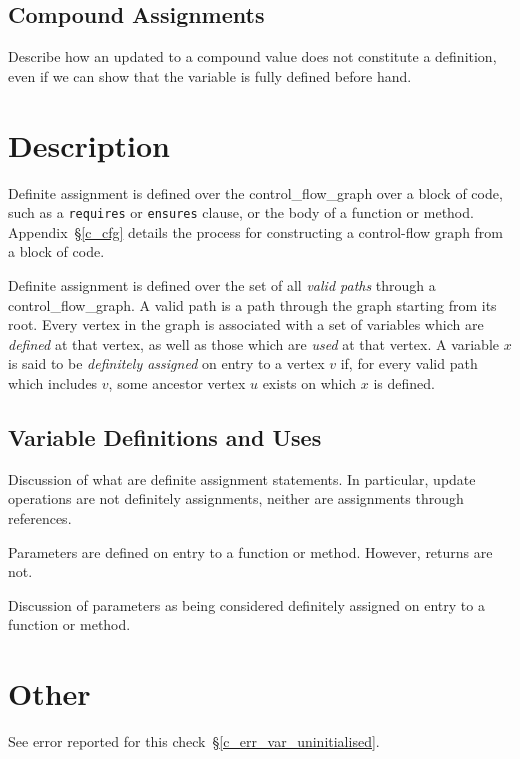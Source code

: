 \subsection{Compound Assignments}

Describe how an updated to a compound value does not constitute a definition, even if we can show that the variable is fully defined before hand.

\section{Description}

Definite assignment is defined over the \gls{control_flow_graph} over a block of code, such as a \lstinline{requires} or \lstinline{ensures} clause, or the body of a function or method.  Appendix~\S\ref{c_cfg} details the process for constructing a control-flow graph from a block of code.

Definite assignment is defined over the set of all {\em valid paths} through a \gls{control_flow_graph}.  A valid path is a path through the graph starting from its root.  Every vertex in the graph is associated with a set of variables which are {\em defined} at that vertex, as well as those which are {\em used} at that vertex.  A variable $x$ is said to be {\em definitely assigned} on entry to a vertex $v$ if, for every valid path which includes $v$, some ancestor vertex $u$ exists on which $x$ is defined.

\subsection{Variable Definitions and Uses}

Discussion of what are definite assignment statements.  In particular, update operations are not definitely assignments, neither are assignments through references.

Parameters are defined on entry to a function or method.  However, returns are not.

Discussion of parameters as being considered definitely assigned on entry to a function or method.

\section{Other}

See error reported for this check~\S\ref{c_err_var_uninitialised}.

